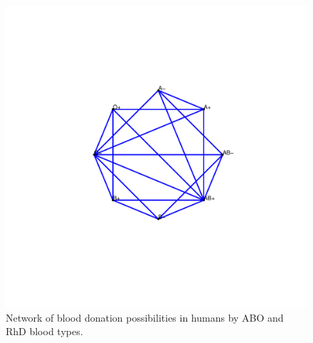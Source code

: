 \documentclass[11pt]{article}\usepackage[]{graphicx}\usepackage[]{color}
\begin{document}
\begin{figure}
\centering
\includegraphics[width=\textwidth]{figure/blood_ex-1.pdf}
\caption{\label{fig.cap:blood_ex} Network of blood donation possibilities in humans by ABO and RhD blood types.}
\end{figure}
\afterpage{\clearpage}
\end{document}
